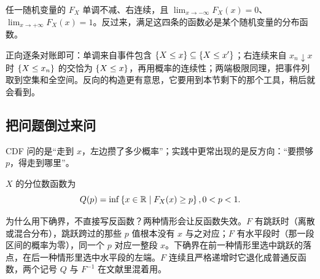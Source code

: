 \begin{proposition}
任一随机变量的 \(F_X\) 单调不减、右连续，且 \(\lim_{x\to-\infty}F_X(x)=0\)、\(\lim_{x\to+\infty}F_X(x)=1\)。反过来，满足这四条的函数必是某个随机变量的分布函数。
\end{proposition}

正向逐条对账即可：单调来自事件包含 \(\left\{X\le x\right\}\subseteq\left\{X\le x'\right\}\)；右连续来自 \(x_n\downarrow x\) 时 \(\left\{X\le x_n\right\}\) 的交恰为 \(\left\{X\le x\right\}\)，再用概率的连续性；两端极限同理，把事件列取到空集和全空间。反向的构造更有意思，它要用到本节剩下的那个工具，稍后就会看到。

\subsection{把问题倒过来问}

CDF 问的是``走到 \(x\)，左边攒了多少概率''；实践中更常出现的是反方向：``要攒够 \(p\)，得走到哪里''。

\begin{definition}
\(X\) 的分位数函数为
\[
Q(p)=\inf\left\{x\in\mathbb{R}\mid F_X(x)\ge p\right\},\space 0<p<1.
\]
\end{definition}

为什么用下确界，不直接写反函数？两种情形会让反函数失效。\(F\) 有跳跃时（离散或混合分布），跳跃跨过的那些 \(p\) 值根本没有 \(x\) 与之对应；\(F\) 有水平段时（那一段区间的概率为零），同一个 \(p\) 对应一整段 \(x\)。下确界在前一种情形里选中跳跃的落点，在后一种情形里选中水平段的左端。\(F\) 连续且严格递增时它退化成普通反函数，两个记号 \(Q\) 与 \(F^{-1}\) 在文献里混着用。

